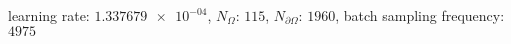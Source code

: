 learning rate: $\num[scientific-notation=true]{1.337679e-04}$, $N_{\Omega}$: $\num[scientific-notation=false]{115}$, $N_{\partial\Omega}$: $\num[scientific-notation=false]{1960}$, batch sampling frequency: $\num[scientific-notation=false]{4975}$